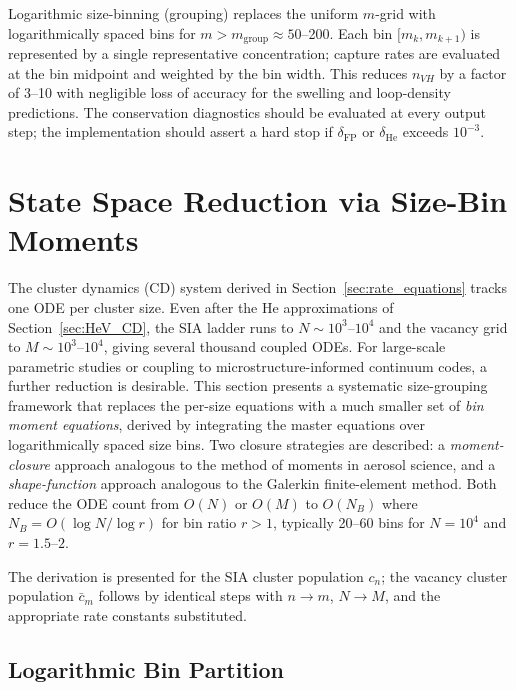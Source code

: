 Logarithmic size-binning (grouping) replaces the uniform $m$-grid with
logarithmically spaced bins for $m > m_{\mathrm{group}} \approx 50$--200.
Each bin $[m_k, m_{k+1})$ is represented by a single representative
concentration; capture rates are evaluated at the bin midpoint and
weighted by the bin width. This reduces $n_{VH}$ by a factor of 3--10
with negligible loss of accuracy for the swelling and loop-density
predictions. The conservation diagnostics should be evaluated at every
output step; the implementation should assert a hard stop if
$\delta_{\mathrm{FP}}$ or $\delta_{\mathrm{He}}$ exceeds $10^{-3}$.

\section{State Space Reduction via Size-Bin Moments}
\label{sec:size_moments}

The cluster dynamics (CD) system derived in
Section~\ref{sec:rate_equations} tracks one ODE per cluster size.
Even after the He approximations of Section~\ref{sec:HeV_CD}, the SIA
ladder runs to $N \sim 10^3$--$10^4$ and the vacancy grid to
$M \sim 10^3$--$10^4$, giving several thousand coupled ODEs. For
large-scale parametric studies or coupling to microstructure-informed
continuum codes, a further reduction is desirable. This section
presents a systematic size-grouping framework that replaces the
per-size equations with a much smaller set of \emph{bin moment
equations}, derived by integrating the master equations over
logarithmically spaced size bins. Two closure strategies are described:
a \emph{moment-closure} approach analogous to the method of moments in
aerosol science, and a \emph{shape-function} approach analogous to the
Galerkin finite-element method. Both reduce the ODE count from
$O(N)$ or $O(M)$ to $O(N_B)$ where
$N_B = O(\log N / \log r)$ for bin ratio $r > 1$, typically 20--60
bins for $N = 10^4$ and $r = 1.5$--$2$.

The derivation is presented for the SIA cluster population $c_n$; the
vacancy cluster population $\bar{c}_m$ follows by identical steps with
$n \to m$, $N \to M$, and the appropriate rate constants substituted.

\subsection{Logarithmic Bin Partition}
\label{sec:log_bins}

